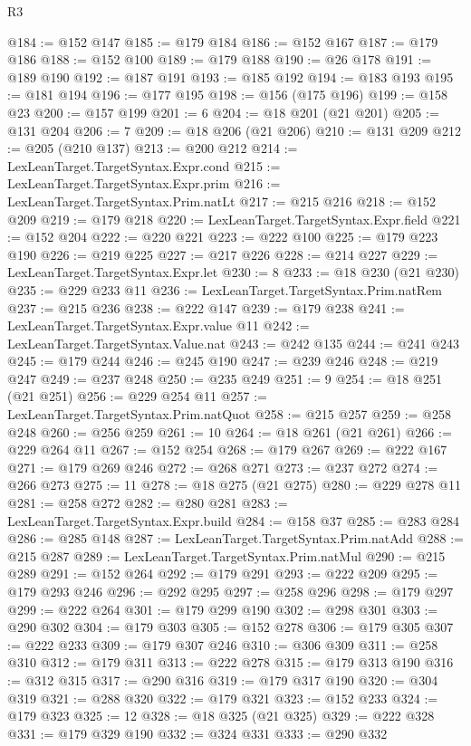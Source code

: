 \begin{lexlean}{R3}
\begin{coremodule}
@184 := @152 @147
@185 := @179 @184
@186 := @152 @167
@187 := @179 @186
@188 := @152 @100
@189 := @179 @188
@190 := @26 @178
@191 := @189 @190
@192 := @187 @191
@193 := @185 @192
@194 := @183 @193
@195 := @181 @194
@196 := @177 @195
@198 := @156 (@175 @196)
@199 := @158 @23
@200 := @157 @199
@201 := 6
@204 := @18 @201 (@21 @201)
@205 := @131 @204
@206 := 7
@209 := @18 @206 (@21 @206)
@210 := @131 @209
@212 := @205 (@210 @137)
@213 := @200 @212
@214 := LexLeanTarget.TargetSyntax.Expr.cond
@215 := LexLeanTarget.TargetSyntax.Expr.prim
@216 := LexLeanTarget.TargetSyntax.Prim.natLt
@217 := @215 @216
@218 := @152 @209
@219 := @179 @218
@220 := LexLeanTarget.TargetSyntax.Expr.field
@221 := @152 @204
@222 := @220 @221
@223 := @222 @100
@225 := @179 @223 @190
@226 := @219 @225
@227 := @217 @226
@228 := @214 @227
@229 := LexLeanTarget.TargetSyntax.Expr.let
@230 := 8
@233 := @18 @230 (@21 @230)
@235 := @229 @233 @11
@236 := LexLeanTarget.TargetSyntax.Prim.natRem
@237 := @215 @236
@238 := @222 @147
@239 := @179 @238
@241 := LexLeanTarget.TargetSyntax.Expr.value @11
@242 := LexLeanTarget.TargetSyntax.Value.nat
@243 := @242 @135
@244 := @241 @243
@245 := @179 @244
@246 := @245 @190
@247 := @239 @246
@248 := @219 @247
@249 := @237 @248
@250 := @235 @249
@251 := 9
@254 := @18 @251 (@21 @251)
@256 := @229 @254 @11
@257 := LexLeanTarget.TargetSyntax.Prim.natQuot
@258 := @215 @257
@259 := @258 @248
@260 := @256 @259
@261 := 10
@264 := @18 @261 (@21 @261)
@266 := @229 @264 @11
@267 := @152 @254
@268 := @179 @267
@269 := @222 @167
@271 := @179 @269 @246
@272 := @268 @271
@273 := @237 @272
@274 := @266 @273
@275 := 11
@278 := @18 @275 (@21 @275)
@280 := @229 @278 @11
@281 := @258 @272
@282 := @280 @281
@283 := LexLeanTarget.TargetSyntax.Expr.build
@284 := @158 @37
@285 := @283 @284
@286 := @285 @148
@287 := LexLeanTarget.TargetSyntax.Prim.natAdd
@288 := @215 @287
@289 := LexLeanTarget.TargetSyntax.Prim.natMul
@290 := @215 @289
@291 := @152 @264
@292 := @179 @291
@293 := @222 @209
@295 := @179 @293 @246
@296 := @292 @295
@297 := @258 @296
@298 := @179 @297
@299 := @222 @264
@301 := @179 @299 @190
@302 := @298 @301
@303 := @290 @302
@304 := @179 @303
@305 := @152 @278
@306 := @179 @305
@307 := @222 @233
@309 := @179 @307 @246
@310 := @306 @309
@311 := @258 @310
@312 := @179 @311
@313 := @222 @278
@315 := @179 @313 @190
@316 := @312 @315
@317 := @290 @316
@319 := @179 @317 @190
@320 := @304 @319
@321 := @288 @320
@322 := @179 @321
@323 := @152 @233
@324 := @179 @323
@325 := 12
@328 := @18 @325 (@21 @325)
@329 := @222 @328
@331 := @179 @329 @190
@332 := @324 @331
@333 := @290 @332

\end{coremodule}
\end{lexlean}
